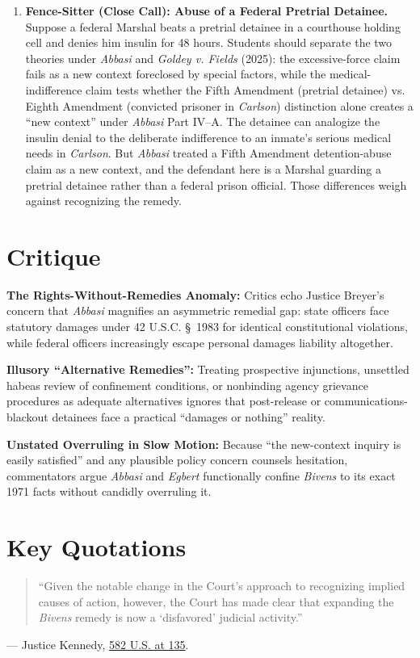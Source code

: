 \documentclass[12pt]{article}
\begin{document}
\begin{enumerate}
\item \textbf{Fence-Sitter (Close Call): Abuse of a Federal Pretrial Detainee.} Suppose a federal Marshal beats a pretrial detainee in a courthouse holding cell and denies him insulin for 48 hours. Students should separate the two theories under \textit{Abbasi} and \textit{Goldey v. Fields} (2025): the excessive-force claim fails as a new context foreclosed by special factors, while the medical-indifference claim tests whether the Fifth Amendment (pretrial detainee) vs. Eighth Amendment (convicted prisoner in \textit{Carlson}) distinction alone creates a ``new context'' under \textit{Abbasi} Part IV--A. The detainee can analogize the insulin denial to the deliberate indifference to an inmate's serious medical needs in \textit{Carlson}. But \textit{Abbasi} treated a Fifth Amendment detention-abuse claim as a new context, and the defendant here is a Marshal guarding a pretrial detainee rather than a federal prison official. Those differences weigh against recognizing the remedy.

\end{enumerate}

\section{Critique}
\textbf{The Rights-Without-Remedies Anomaly:} Critics echo Justice Breyer's concern that \textit{Abbasi} magnifies an asymmetric remedial gap: state officers face statutory damages under 42 U.S.C. \S~1983 for identical constitutional violations, while federal officers increasingly escape personal damages liability altogether.

\textbf{Illusory ``Alternative Remedies'':} Treating prospective injunctions, unsettled habeas review of confinement conditions, or nonbinding agency grievance procedures as adequate alternatives ignores that post-release or communications-blackout detainees face a practical ``damages or nothing'' reality.

\textbf{Unstated Overruling in Slow Motion:} Because ``the new-context inquiry is easily satisfied'' and any plausible policy concern counsels hesitation, commentators argue \textit{Abbasi} and \textit{Egbert} functionally confine \textit{Bivens} to its exact 1971 facts without candidly overruling it.

\section{Key Quotations}
\begin{quote}
``Given the notable change in the Court's approach to recognizing implied causes of action, however, the Court has made clear that expanding the \textit{Bivens} remedy is now a `disfavored' judicial activity.''
\end{quote}
\noindent --- Justice Kennedy, \href{https://www.law.cornell.edu/supremecourt/text/15-1358}{582 U.S. at 135}.
\end{document}
